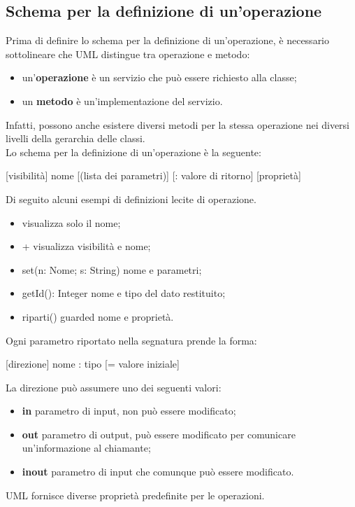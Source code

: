 \documentclass[12pt]{report}
\begin{document}
\subsection{Schema per la definizione di un'operazione}
Prima di definire lo schema per la definizione di un'operazione, è necessario sottolineare che UML distingue tra operazione e metodo:
\begin{itemize}
	\item un'\textbf{operazione} è un servizio che può essere richiesto alla classe;
	\item un \textbf{metodo} è un'implementazione del servizio.
\end{itemize}
Infatti, possono anche esistere diversi metodi per la stessa operazione nei diversi livelli della gerarchia delle classi. \\
Lo schema per la definizione di un'operazione è la seguente:
\begin{center}
	[visibilità] nome [(lista dei parametri)] [: valore di ritorno] [{proprietà}]
\end{center}
Di seguito alcuni esempi di definizioni lecite di operazione.
\begin{itemize}
	\item visualizza \quad solo il nome;
	\item + visualizza \quad visibilità e nome;
	\item set(n: Nome; s: String) \quad  nome e parametri;
	\item getId(): Integer \quad nome e tipo del dato restituito;
	\item riparti() {guarded} \quad nome e proprietà.
\end{itemize}
Ogni parametro riportato nella segnatura prende la forma:
\begin{center}
	[direzione] nome : tipo [= valore iniziale]
\end{center}
La direzione può assumere uno dei seguenti valori:
\begin{itemize}
	\item \textbf{in} \quad parametro di input, non può essere modificato;
	\item \textbf{out} \quad parametro di output, può essere modificato per comunicare un'informazione al chiamante;
	\item \textbf{inout} \quad parametro di input che comunque può essere modificato.
\end{itemize}
UML fornisce diverse proprietà predefinite per le operazioni.
\end{document}
